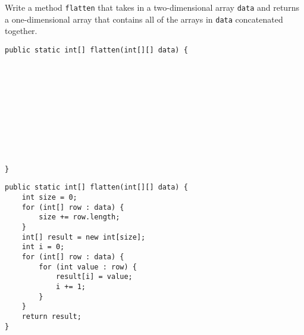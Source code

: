 \question Write a method \texttt{flatten} that takes in a two-dimensional array \texttt{data} and returns a one-dimensional array that contains all of the arrays in \texttt{data} concatenated together.

\ifprintanswers\else
\begin{lstlisting}
public static int[] flatten(int[][] data) {











}
\end{lstlisting}
\fi

\begin{solution}
\begin{lstlisting}
public static int[] flatten(int[][] data) {
    int size = 0;
    for (int[] row : data) {
        size += row.length;
    }
    int[] result = new int[size];
    int i = 0;
    for (int[] row : data) {
        for (int value : row) {
            result[i] = value;
            i += 1;
        }
    }
    return result;
}
\end{lstlisting}
\end{solution}